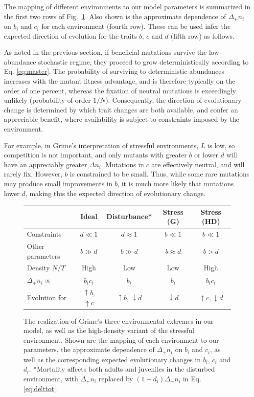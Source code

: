 \documentclass[11pt]{article}
\begin{document}
The mapping of different environments to our model parameters is summarized in the first two rows of Fig.~\ref{fig:table}. Also shown is the approximate dependence of $\Delta_+ n_i$ on $b_i$ and $c_i$ for each environment (fourth row). These can be used infer the expected direction of evolution for the traits $b$, $c$ and $d$ (fifth row) as follows. 

As noted in the previous section, if beneficial mutations survive the low-abundance stochastic regime, they proceed to grow deterministically according to Eq. \eqref{eq:master}. The probability of surviving to deterministic abundances increases with the mutant fitness advantage, and is therefore typically on the order of one percent, whereas the fixation of neutral mutations is exceedingly unlikely (probability of order $1/N$). Consequently, the direction of evolutionary change is determined by which trait changes are both available, and confer an appreciable benefit, where availability is subject to constraints imposed by the environment. 

For example, in Grime's interpretation of stressful environments, $L$ is low, so competition is not important, and only mutants with greater $b$ or lower $d$ will have an appreciably greater $\Delta n_i$. Mutations in $c$ are effectively neutral, and will rarely fix. However, $b$ is constrained to be small. Thus, while some rare mutations may produce small improvements in $b$, it is much more likely that mutations lower $d$, making this the expected direction of evolutionary change. 

\begin{figure}
\centering
\begin{tabular}{l*{4}{c}}
  & Ideal & Disturbance* & Stress (G) & Stress (HD) \\ \hline
  Constraints & $d \ll 1$ & $d \approx 1$ & $b \ll 1$ & $b \ll 1$ \\
  Other parameters & $b\gg d$ & $b\gg d$ & $b\approx d$ & $b>d$ \\
  Density $N/T$  & High & Low & Low & High \\
  $\Delta_+ n_i\propto$ & $b_i c_i$ & $b_i$ & $b_i$ & $b_i c_i$ \\
  Evolution for & $\uparrow b$, $ \uparrow c$ & $\uparrow b$, $\downarrow d$ & $\downarrow d$ & $\uparrow c, \downarrow d$
\end{tabular}
\caption{\label{fig:table} The realization of Grime's three environmental extremes in our model, as well as the high-density variant of the stressful environment. Shown are the mapping of each environment to our parameters, the approximate dependence of $\Delta_+ n_i$ on $b_i$ and $c_i$, as well as the corresponding expected evolutionary changes in $b_i$, $c_i$ and $d_i$. *Mortality affects both adults and juveniles in the disturbed environment, with $\Delta_+ n_i$ replaced by $(1-d_i)\Delta_+ n_i$ in Eq. \eqref{eq:delttot}.}
\end{figure}
\end{document}

